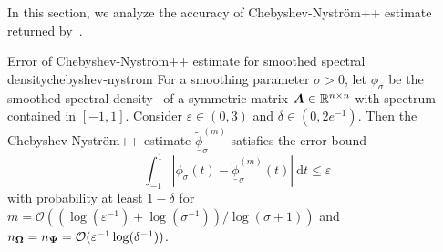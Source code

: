 In this section, we analyze the accuracy of Chebyshev-Nyström++ estimate returned by~. 
\begin{theorem}{Error of Chebyshev-Nyström++ estimate for smoothed spectral density}{chebyshev-nystrom}
    For a smoothing parameter $\sigma > 0$, let $\phi_{\sigma}$ be the smoothed spectral density~ of a symmetric matrix $\boldsymbol{A} \in \mathbb{R}^{n \times n}$ with spectrum contained in $[-1, 1]$. Consider $\varepsilon \in (0, 3)$ and $\delta \in (0, 2 e^{-1})$.
    Then the Chebyshev-Nyström++ estimate $\widetilde{\underline{\phi}}_{\sigma}^{(m)}$ 
    satisfies the error bound
    \begin{equation*}
        \int_{-1}^{1} \left| \phi_{\sigma}(t) - \widetilde{\underline{\phi}}_{\sigma}^{(m)}(t) \right|~\mathrm{d}t \leq \varepsilon
        \label{equ:chebyshev-nystrom-error}
    \end{equation*}
    with probability at least $1 - \delta$ for $m = \mathcal{O}((\log(\varepsilon^{-1}) + \log(\sigma^{-1})) / \log(\sigma + 1))$  and $n_{\boldsymbol{\Omega}} = n_{\boldsymbol{\Psi}} = \mathcal{O}(\varepsilon^{-1}\log(\delta^{-1}))$.
\end{theorem}

